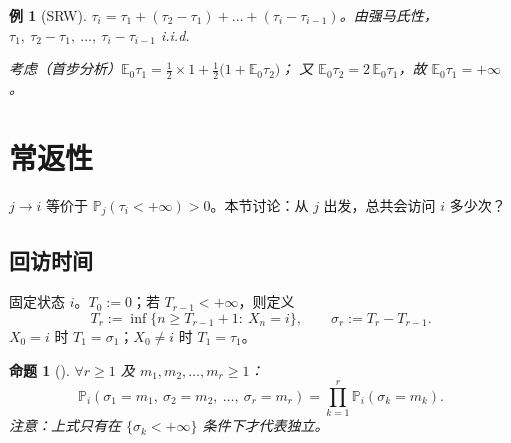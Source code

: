 \documentclass[lang=cn,10pt,newtx,thmcnt=chapter,mode=simple]{vividbook}
\providecommand{\E}{}\renewcommand{\E}{\mathbb{E}}
\providecommand{\Pp}{}\renewcommand{\Pp}{\mathbb{P}}
\newcommand{\reach}{\to}
\theoremstyle{vividthm}
\newtheorem*{vividproposition}{命题}
\theoremstyle{vividdef}
\theoremstyle{vividexa}
\newtheorem*{vividexample}{例}
\theoremstyle{vividrem}
\renewenvironment{proposition}[1][]{\begin{vividproposition}[#1]}{\end{vividproposition}}
\newenvironment{example}[1][]{\begin{vividexample}[#1]}{\end{vividexample}}
\begin{document}
\begin{example}[SRW]
$\tau_i=\tau_1+(\tau_2-\tau_1)+\dots+(\tau_i-\tau_{i-1})$。由强马氏性，
$\tau_1,\ \tau_2-\tau_1,\ \dots,\ \tau_i-\tau_{i-1}$ i.i.d.

考虑（首步分析）$\E_0\tau_1=\tfrac12\times1+\tfrac12\bigl(1+\E_0\tau_2\bigr)$；
又 $\E_0\tau_2=2\,\E_0\tau_1$，故 $\E_0\tau_1=+\infty$。
\end{example}

\section{常返性}

$j\reach i$ 等价于 $\Pp_j(\tau_i<+\infty)>0$。本节讨论：从 $j$ 出发，总共会访问 $i$ 多少次？

\subsection{回访时间}

固定状态 $i$。$T_0:=0$；若 $T_{r-1}<+\infty$，则定义
\[
T_r:=\inf\{n\ge T_{r-1}+1:\ X_n=i\},
\qquad
\sigma_r:=T_r-T_{r-1}.
\]
$X_0=i$ 时 $T_1=\sigma_1$；$X_0\ne i$ 时 $T_1=\tau_1$。

\begin{proposition}
$\forall r\ge1$ 及 $m_1,m_2,\dots,m_r\ge1$：
\[
\Pp_i(\sigma_1=m_1,\ \sigma_2=m_2,\ \dots,\ \sigma_r=m_r)
=\prod_{k=1}^{r}\Pp_i(\sigma_k=m_k).
\]
注意：上式只有在 $\{\sigma_k<+\infty\}$ 条件下才代表独立。
\end{proposition}
\end{document}
